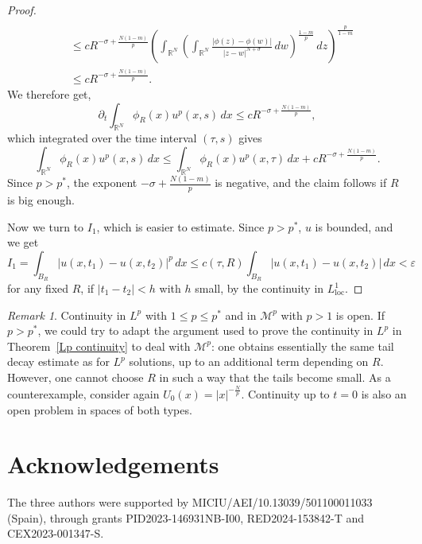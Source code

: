 \documentclass[leqno,12pt]{amsart}
\theoremstyle{definition}
\theoremstyle{remark}
\newtheorem{remark}{Remark}
\numberwithin{equation}{section}
\begin{document}
\begin{proof}
\begin{align*}
 \\&
\le  cR^{-\sigma+\frac{N(1-m)}{p}}\left(\int_{\mathbb{R}^N}\left( \int_{\mathbb{R}^N}\frac{|\phi(z)-\phi(w)|}{|z-w|^{N+\sigma}}\,dw\right)^{\frac{1-m}{p}}\,dz\right)^{\frac p{1-m}}
 \\&
\le  cR^{-\sigma+\frac{N(1-m)}{p}}.
\end{align*}
We therefore get,
$$
\partial_t\int_{\mathbb{R}^N}\phi_R(x)u^p(x,s)\,dx\le cR^{-\sigma+\frac{N(1-m)}{p}},
$$
which integrated over the time interval $(\tau,s)$  gives
$$
\int_{\mathbb{R}^N}\phi_R(x)u^p(x,s)\,dx\le \int_{\mathbb{R}^N}\phi_R(x)u^p(x,\tau)\,dx+cR^{-\sigma+\frac{N(1-m)}{p}}. 
$$
Since $p>p^*$, the exponent $-\sigma+\frac{N(1-m)}{p}$ is negative, and the claim follows if $R$ is big enough. 

Now we turn to $I_1$, which is easier to estimate. Since $p>p^*$, $u$ is bounded, and we get
$$
    I_1=\int_{B_R}|u(x,t_1)-u(x,t_2)|^p\,dx \le c(\tau,R)\int_{B_R}|u(x,t_1)-u(x,t_2)|\,dx<\varepsilon
$$
for any fixed $R$, if $|t_1-t_2|<h$ with $h$ small,  by the continuity in $L^1_{\text{loc}}$. 
\end{proof}


\begin{remark} Continuity in  $L^p$ with $1\le p\le p^*$ and in $\mathcal{M}^p$ with $p>1$ is open. If $p>p^*$, we could try to adapt the argument used to prove the continuity in $L^p$ in Theorem~\ref{Lp continuity} to deal with $\mathcal{M}^p$: one obtains essentially the same tail decay estimate as for $L^p$ solutions, up to an additional term depending on $R$. However,  one cannot choose $R$ in such a way that the tails become small. As a counterexample, consider again $U_0(x)=|x|^{-\frac{N}{p}}$. Continuity up to $t=0$ is also an open problem in spaces of both types.
\end{remark}



\section*{Acknowledgements}
The three authors were supported by MICIU/AEI/10.13039/501100011033 (Spain), through  grants PID2023-146931NB-I00, RED2024-153842-T and CEX2023-001347-S.
\end{document}
